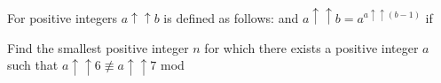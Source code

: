 For positive integers  $a\uparrow\uparrow b$ is defined as follows:  and $a\uparrow\uparrow b=a^{a\uparrow\uparrow (b-1)}$ if 

Find the smallest positive integer $n$ for which there exists a positive integer $a$ such that $a\uparrow\uparrow 6\not \equiv a\uparrow\uparrow 7$ mod 